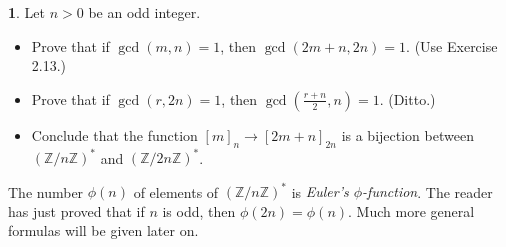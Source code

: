 \documentclass{article}
\theoremstyle{definition}
\newtheorem{ex}{}[section]
\begin{document}
\begin{ex}
	Let $n > 0$ be an odd integer.
	\begin{itemize}
		\item Prove that if $\gcd(m, n) = 1$, then $\gcd(2m + n, 2n) = 1$.
		      (Use Exercise 2.13.)
		\item Prove that if $\gcd(r, 2n) = 1$, then $\gcd(\frac{r + n}{2}, n) = 1$. (Ditto.)
		\item Conclude that the function $[m]_n \to [2m + n]_{2n}$ is a bijection between $(\mathbb{Z}/n \mathbb{Z})^*$ and $(\mathbb{Z}/2n \mathbb{Z})^*$.
	\end{itemize}
	The number $\phi(n)$ of elements of $(\mathbb{Z}/n \mathbb{Z})^*$ is \textit{Euler's $\phi$-function}.
	The reader has just proved that if $n$ is odd, then $\phi(2n) = \phi(n)$.
	Much more general formulas will be given later on.
\end{ex}
\end{document}

